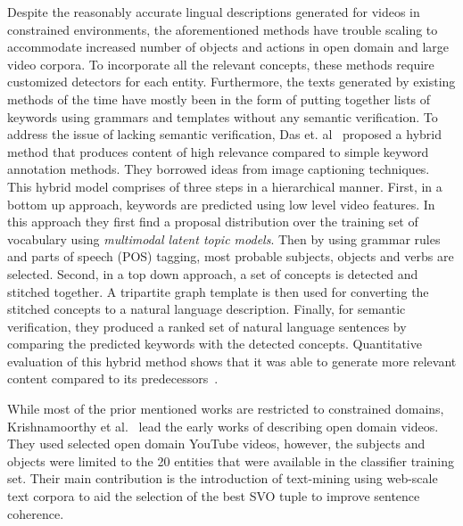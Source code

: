 \documentclass[10pt,journal,compsoc]{IEEEtran}
\begin{document}
Despite the reasonably accurate lingual descriptions generated for videos in constrained environments, the aforementioned methods have trouble scaling to accommodate increased number of objects and actions in open domain and large video corpora. To incorporate all the relevant concepts, these methods require customized detectors for each entity. Furthermore, the texts generated by existing methods of the time have mostly been in the form of putting together lists of keywords using grammars and templates without any semantic verification. To address the issue of lacking semantic verification, Das et. al~\cite{das2013thousand} proposed a hybrid method that produces content of high relevance compared to simple keyword annotation methods. They borrowed ideas from image captioning techniques. 
This hybrid model comprises of three steps in a hierarchical manner. %
First, in a bottom up approach, keywords are predicted using low level video features. In this approach they first find a proposal distribution over the training set of vocabulary using \textit{multimodal latent topic models}. Then by using grammar rules and parts of speech (POS) tagging, most probable subjects, objects and verbs are selected. Second, in a top down approach, a set of concepts is detected and stitched together. A tripartite graph template is then used for converting the stitched concepts to a natural language description. Finally, for semantic verification, they produced a ranked set of natural language sentences by comparing the predicted keywords with the detected concepts. Quantitative evaluation of this hybrid method shows that it was able to generate more relevant content compared to its predecessors~\cite{barbu2012video,khan2012describing}.

\vspace{2mm}
 While most of the prior mentioned works are restricted to constrained domains, Krishnamoorthy et al.~\cite{krishnamoorthy2013generating} lead the  early works of describing open domain videos. They used selected open domain YouTube videos, however, the subjects and objects were limited to the 20 entities that were available in the classifier training set. Their main contribution is the introduction of text-mining using web-scale text corpora to aid the selection of the best SVO tuple to improve sentence coherence. 
\end{document}
